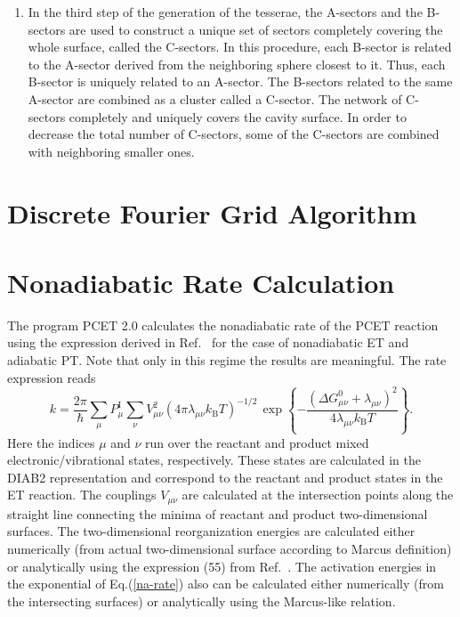 \documentclass[oneside,11pt,openany]{book}
\newcommand{\tw}{\ttfamily}
\begin{document}
\begin{enumerate}
{The default is NTETFI1=NTETFI2=1, which leads to step sizes of 3$^o$.
This leads to 7200 B-sectors per sphere.}
\item{
In the third step of the generation of the tesserae, 
the A-sectors and the B-sectors are used to construct a unique
set of sectors completely covering the whole surface, called
the C-sectors.  In this procedure, each B-sector is
related to the A-sector derived from the neighboring sphere
closest to it.  Thus, each B-sector is uniquely related
to an A-sector.  The B-sectors related to
the same A-sector are combined as a cluster
called a C-sector.  The network of C-sectors
completely and uniquely covers the cavity surface.
In order to decrease the total number of C-sectors,
some of the C-sectors are combined with neighboring smaller ones.}
\end{enumerate}



\section{Discrete Fourier Grid Algorithm}



\section{Nonadiabatic Rate Calculation}
The program PCET 2.0 calculates the nonadiabatic rate of the PCET
reaction using the expression derived in Ref.~\cite{pcet-jcp2}
for the case of nonadiabatic ET and adiabatic PT. Note that
only in this regime the results are meaningful. The rate expression
reads
\begin{equation}
k=\frac{2\pi}{\hbar}\sum_{\mu}P_{\mu}^{\mathrm I}
\sum_{\nu}V_{\mu\nu}^2
(4\pi\lambda_{\mu\nu}k_{\mathrm B}T)^{-1/2}\,
\exp\left\{-\frac{(\Delta G_{\mu\nu}^0+\lambda_{\mu\nu})^2}
{4\lambda_{\mu\nu}k_{\mathrm B}T}\right\}.
\label{na-rate}
\end{equation}
Here the indices $\mu$ and $\nu$ run over the reactant and product
mixed electronic/vibrational states, respectively. These states
are calculated in the {\tw DIAB2} representation and
correspond to the reactant and product states in the ET reaction.
The couplings $V_{\mu\nu}$ are calculated at the intersection
points along the straight line connecting the minima of reactant
and product two-dimensional surfaces. The two-dimensional reorganization energies are calculated either numerically (from actual two-dimensional
surface according to Marcus definition) or analytically using
the expression (55) from Ref.~\cite{pcet-jcp2}. The activation
energies in the exponential of Eq.(\ref{na-rate}) also
can be calculated either numerically (from the intersecting
surfaces) or analytically using the Marcus-like relation.
\end{document}
